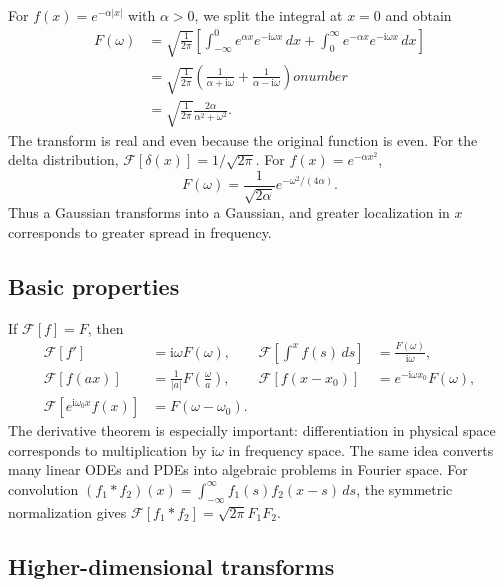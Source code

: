 \begin{example}
For $f(x)=e^{-\alpha|x|}$ with $\alpha>0$, we split the integral at $x=0$ and obtain
\begin{align}
F(\omega) &=\sqrt{\frac{1}{2\pi}}\left[\int_{-\infty}^{0}e^{\alpha x}e^{-\mathrm{i}\omega x}\,dx+
\int_0^{\infty}e^{-\alpha x}e^{-\mathrm{i}\omega x}\,dx\right]\nonumber\\
&=\sqrt{\frac{1}{2\pi}}\left(\frac{1}{\alpha+\mathrm{i}\omega}+\frac{1}{\alpha-\mathrm{i}\omega}\right)
onumber\\
&=\sqrt{\frac{1}{2\pi}}\frac{2\alpha}{\alpha^2+\omega^2}.
\end{align}
The transform is real and even because the original function is even. For the delta distribution, $\mathcal{F}[\delta(x)]=1/\sqrt{2\pi}$. For $f(x)=e^{-\alpha x^2}$,
\begin{equation}
F(\omega)=\frac{1}{\sqrt{2\alpha}}e^{-\omega^2/(4\alpha)}.
\end{equation}
Thus a Gaussian transforms into a Gaussian, and greater localization in $x$ corresponds to greater spread in frequency.
\end{example}

\subsection{Basic properties}

If $\mathcal{F}[f]=F$, then
\begin{align}
\mathcal{F}[f']&=\mathrm{i}\omega F(\omega), &
\mathcal{F}\left[\int^x f(s)\,ds\right]&=\frac{F(\omega)}{\mathrm{i}\omega},\\
\mathcal{F}[f(ax)]&=\frac{1}{|a|}F\left(\frac{\omega}{a}\right), &
\mathcal{F}[f(x-x_0)]&=e^{-\mathrm{i}\omega x_0}F(\omega),\\
\mathcal{F}[e^{\mathrm{i}\omega_0x}f(x)]&=F(\omega-\omega_0).
\end{align}
The derivative theorem is especially important: differentiation in physical space corresponds to multiplication by $\mathrm{i}\omega$ in frequency space. The same idea converts many linear ODEs and PDEs into algebraic problems in Fourier space. For convolution $(f_1*f_2)(x)=\int_{-\infty}^{\infty}f_1(s)f_2(x-s)\,ds$, the symmetric normalization gives $\mathcal{F}[f_1*f_2]=\sqrt{2\pi}F_1F_2$.

\subsection{Higher-dimensional transforms}


